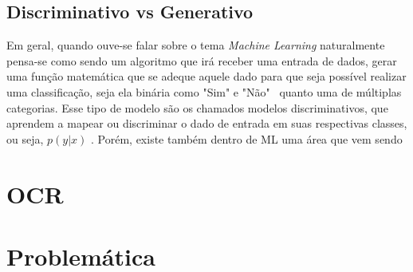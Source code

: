 \subsection{Discriminativo vs Generativo} \label{ssec:generative-vs-discriminative}

Em geral, quando ouve-se falar sobre o tema \textit{Machine Learning} naturalmente pensa-se como sendo um algoritmo que irá receber uma entrada de dados, gerar uma função matemática que se adeque aquele dado para que seja possível realizar uma classificação, seja ela binária como "Sim" e "Não" \  quanto uma de múltiplas categorias. Esse tipo de modelo são os chamados modelos discriminativos, que aprendem a mapear ou discriminar o dado de entrada em suas respectivas classes, ou seja, \(p(y | x)\) \cite{discriminative-vs-generative}. Porém, existe também dentro de ML uma área que vem sendo

\section{OCR}

\section{Problemática}